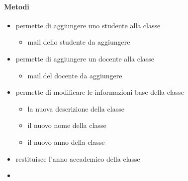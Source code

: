 \paragraph{Metodi}
\begin{itemize}
\item {}
\newline
permette di aggiungere uno studente alla classe
\newline
{}
\newline
\begin{itemize}
\item {}
\newline
mail dello studente da aggiungere
\end{itemize}
\item {}
\newline
permette di aggiungere un docente alla classe
\newline
{}
\newline
\begin{itemize}
\item {}
\newline
mail del docente da aggiungere
\end{itemize}
\item {}
\newline
permette
di modificare le informazioni base della classe
\newline
{}
\newline
\begin{itemize}
\item {}
\newline
la nuova descrizione della classe
\item {}
\newline
il nuovo nome della classe
\item {}
\newline
il nuovo anno della classe
\end{itemize}
\item {}
\newline
restituisce l'anno accademico della classe
\newline
\item {}

\end{itemize}
